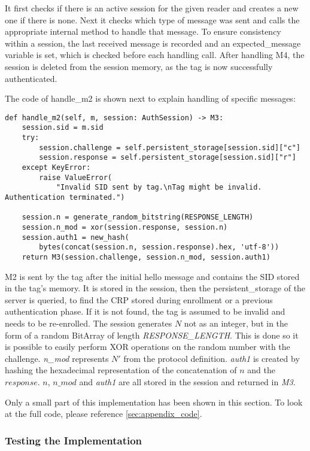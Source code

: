 It first checks if there is an active session for the given reader and creates a new one if there is none.
Next it checks which type of message was sent and calls the appropriate internal method to handle
that message. To ensure consistency within a session, the last received message is recorded and
an expected\_message variable is set, which is checked before each handling call.
After handling M4, the session is deleted from the session memory, as the tag is now successfully authenticated.

The code of handle\_m2 is shown next to explain handling of specific messages:

\begin{lstlisting}
def handle_m2(self, m, session: AuthSession) -> M3:
    session.sid = m.sid
    try:
        session.challenge = self.persistent_storage[session.sid]["c"]
        session.response = self.persistent_storage[session.sid]["r"]
    except KeyError:
        raise ValueError(
            "Invalid SID sent by tag.\nTag might be invalid. Authentication terminated.")

    session.n = generate_random_bitstring(RESPONSE_LENGTH)
    session.n_mod = xor(session.response, session.n)
    session.auth1 = new_hash(
        bytes(concat(session.n, session.response).hex, 'utf-8'))
    return M3(session.challenge, session.n_mod, session.auth1)
\end{lstlisting}

M2 is sent by the tag after the initial hello message and contains the SID stored in the tag's memory.
It is stored in the session, then the persistent\_storage of the server is queried, to find the
CRP stored during enrollment or a previous authentication phase. If it is not found, the tag is assumed to
be invalid and needs to be re-enrolled.
The session generates $N$ not as an integer, but in the form of a random BitArray of length \emph{RESPONSE\_LENGTH}.
This is done so it is possible to easily perform XOR operations on the random number with the challenge.
\emph{n\_mod} represents $N'$ from the protocol definition.
\emph{auth1} is created by hashing the hexadecimal representation of the concatenation of $n$ and the $response$.
$n$, $n\_mod$ and \emph{auth1} are all stored in the session and returned in \emph{M3}.

Only a small part of this implementation has been shown in this section. To look at the full code, please reference
\ref{sec:appendix_code}.

\subsubsection{Testing the Implementation}

